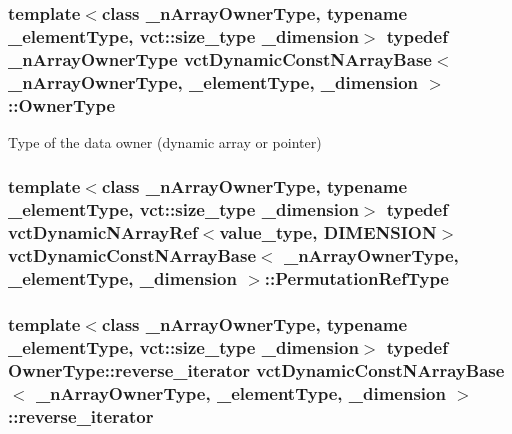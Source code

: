 \subsubsection[{Owner\+Type}]{\setlength{\rightskip}{0pt plus 5cm}template$<$class \+\_\+n\+Array\+Owner\+Type, typename \+\_\+element\+Type, vct\+::size\+\_\+type \+\_\+dimension$>$ typedef \+\_\+n\+Array\+Owner\+Type {\bf vct\+Dynamic\+Const\+N\+Array\+Base}$<$ \+\_\+n\+Array\+Owner\+Type, \+\_\+element\+Type, \+\_\+dimension $>$\+::{\bf Owner\+Type}}\label{classvct_dynamic_const_n_array_base_aad4328d01dc43be4b9047d594ed2ae8d}
Type of the data owner (dynamic array or pointer) \hypertarget{classvct_dynamic_const_n_array_base_a968acf814b972b47aa2ea39105e67fb3}{}
\subsubsection[{Permutation\+Ref\+Type}]{\setlength{\rightskip}{0pt plus 5cm}template$<$class \+\_\+n\+Array\+Owner\+Type, typename \+\_\+element\+Type, vct\+::size\+\_\+type \+\_\+dimension$>$ typedef {\bf vct\+Dynamic\+N\+Array\+Ref}$<$value\+\_\+type, {\bf D\+I\+M\+E\+N\+S\+I\+O\+N}$>$ {\bf vct\+Dynamic\+Const\+N\+Array\+Base}$<$ \+\_\+n\+Array\+Owner\+Type, \+\_\+element\+Type, \+\_\+dimension $>$\+::{\bf Permutation\+Ref\+Type}}\label{classvct_dynamic_const_n_array_base_a968acf814b972b47aa2ea39105e67fb3}
\hypertarget{classvct_dynamic_const_n_array_base_a028c350d6f74e002681cce4239dfdbc1}{}
\subsubsection[{reverse\+\_\+iterator}]{\setlength{\rightskip}{0pt plus 5cm}template$<$class \+\_\+n\+Array\+Owner\+Type, typename \+\_\+element\+Type, vct\+::size\+\_\+type \+\_\+dimension$>$ typedef Owner\+Type\+::reverse\+\_\+iterator {\bf vct\+Dynamic\+Const\+N\+Array\+Base}$<$ \+\_\+n\+Array\+Owner\+Type, \+\_\+element\+Type, \+\_\+dimension $>$\+::{\bf reverse\+\_\+iterator}}\label{classvct_dynamic_const_n_array_base_a028c350d6f74e002681cce4239dfdbc1}
\hypertarget{classvct_dynamic_const_n_array_base_a4170184942c320b2402ba8dfdab9a915}{}
